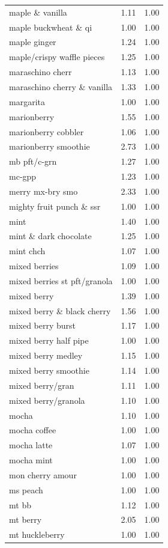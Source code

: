 \begin{table}
\begin{tabular}{lrr}
maple \& vanilla & 1.11 & 1.00 \\
maple buckwheat \& qi & 1.00 & 1.00 \\
maple ginger & 1.24 & 1.00 \\
maple/crispy waffle pieces & 1.25 & 1.00 \\
maraschino cherr & 1.13 & 1.00 \\
maraschino cherry \& vanilla & 1.33 & 1.00 \\
margarita & 1.00 & 1.00 \\
marionberry & 1.55 & 1.00 \\
marionberry cobbler & 1.06 & 1.00 \\
marionberry smoothie & 2.73 & 1.00 \\
mb pft/c-grn & 1.27 & 1.00 \\
mc-gpp & 1.23 & 1.00 \\
merry mx-bry smo & 2.33 & 1.00 \\
mighty fruit punch \& ssr & 1.00 & 1.00 \\
mint & 1.40 & 1.00 \\
mint \& dark chocolate & 1.25 & 1.00 \\
mint chch & 1.07 & 1.00 \\
mixed berries & 1.09 & 1.00 \\
mixed berries st pft/granola & 1.00 & 1.00 \\
mixed berry & 1.39 & 1.00 \\
mixed berry \& black cherry & 1.56 & 1.00 \\
mixed berry burst & 1.17 & 1.00 \\
mixed berry half pipe & 1.00 & 1.00 \\
mixed berry medley & 1.15 & 1.00 \\
mixed berry smoothie & 1.14 & 1.00 \\
mixed berry/gran & 1.11 & 1.00 \\
mixed berry/granola & 1.10 & 1.00 \\
mocha & 1.10 & 1.00 \\
mocha coffee & 1.00 & 1.00 \\
mocha latte & 1.07 & 1.00 \\
mocha mint & 1.00 & 1.00 \\
mon cherry amour & 1.00 & 1.00 \\
ms peach & 1.00 & 1.00 \\
mt bb & 1.12 & 1.00 \\
mt berry & 2.05 & 1.00 \\
mt huckleberry & 1.00 & 1.00 \\

\end{tabular}
\end{table}
